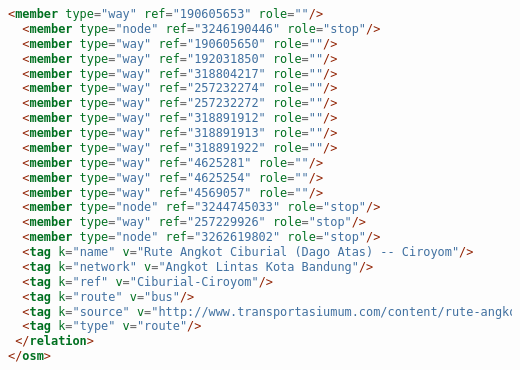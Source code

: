 \begin{lstlisting}[language=HTML,basicstyle=\tiny,caption=bandung1.xml]
  <member type="way" ref="190605653" role=""/>
  <member type="node" ref="3246190446" role="stop"/>
  <member type="way" ref="190605650" role=""/>
  <member type="way" ref="192031850" role=""/>
  <member type="way" ref="318804217" role=""/>
  <member type="way" ref="257232274" role=""/>
  <member type="way" ref="257232272" role=""/>
  <member type="way" ref="318891912" role=""/>
  <member type="way" ref="318891913" role=""/>
  <member type="way" ref="318891922" role=""/>
  <member type="way" ref="4625281" role=""/>
  <member type="way" ref="4625254" role=""/>
  <member type="way" ref="4569057" role=""/>
  <member type="node" ref="3244745033" role="stop"/>
  <member type="way" ref="257229926" role="stop"/>
  <member type="node" ref="3262619802" role="stop"/>
  <tag k="name" v="Rute Angkot Ciburial (Dago Atas) -- Ciroyom"/>
  <tag k="network" v="Angkot Lintas Kota Bandung"/>
  <tag k="ref" v="Ciburial-Ciroyom"/>
  <tag k="route" v="bus"/>
  <tag k="source" v="http://www.transportasiumum.com/content/rute-angkot-bandung"/>
  <tag k="type" v="route"/>
 </relation>
</osm>
\end{lstlisting}